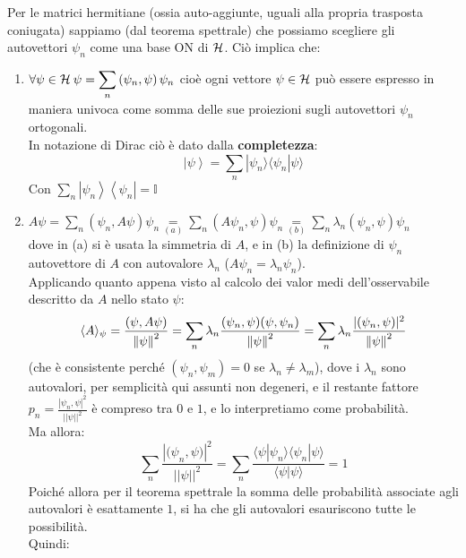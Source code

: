 Per le matrici hermitiane (ossia auto-aggiunte, uguali alla propria trasposta coniugata) sappiamo (dal teorema spettrale) che possiamo scegliere gli autovettori $\psi_n$ come una base ON di $\mathcal{H}$. Ciò implica che:
\begin{enumerate}
    \item $\displaystyle \forall \psi \in \mathcal{H} \> \psi = \sum_{n}{\left(\psi_n, \psi\right)\psi_n}$
    cioè ogni vettore $\psi \in \mathcal{H}$ può essere espresso in maniera univoca come somma delle sue proiezioni sugli autovettori $\psi_n$ ortogonali.\\
    In notazione di Dirac ciò è dato dalla \textbf{completezza}:
    \[
	\left|\psi\right\rangle=\sum_{n}{|\psi_n\rangle \langle\psi_n|\psi\rangle }
	\]
	Con $\sum_{n}{\left|\psi_n\right\rangle\left\langle\psi_n\right|=\mathbb{I}}$
	\item $\displaystyle A\psi = \sum_{n}{\left(\psi_n, A\psi\right)\psi_n \underset{(a)}{=} \sum_{n}{\left(A\psi_n, \psi\right)\psi_n \underset{(b)}{=}\sum_{n}{\lambda_n\left(\psi_n, \psi\right)\psi_n}}}$\\
	dove in (a) si è usata la simmetria di $A$, e in (b) la definizione di $\psi_n$ autovettore di $A$ con autovalore $\lambda_n$ ($A\psi_n = \lambda_n \psi_n$).\\
	Applicando quanto appena visto al calcolo dei valor medi dell'osservabile descritto da $A$ nello stato $\psi$:
	\[
	\langle A \rangle_\psi = \frac{(\psi,A\psi)}{\left\lVert\psi\right\rVert^2} = \sum_n \lambda_n \frac{(\psi_n, \psi)(\psi, \psi_n)}{\left\lVert\psi\right\rVert^2} = \sum_n \lambda_n \frac{|(\psi_n, \psi)|^2}{\left\lVert\psi\right\rVert^2}
	\]
	(che è consistente perché $\left(\psi_n, \psi_m\right)=0$ se $\lambda_n\neq \lambda_m$), dove i $\lambda_n$ sono autovalori, per semplicità qui assunti non degeneri, e il restante fattore $\displaystyle p_n = \frac{\left|\psi_n,\psi\right|^2}{\left|\left|\psi\right|\right|^2}$ è compreso tra $0$ e $1$, e lo interpretiamo come probabilità.\\
	Ma allora:
	\[
	\sum_{n}{\frac{\left|{(\psi}_n, \psi)\right|^2}{\left|\left|\psi\right|\right|^2}=\sum_{n}\frac{\langle\psi|\psi_n\rangle \langle\psi_n|\psi\rangle }{\langle\psi|\psi\rangle }=1 }
	\]
	Poiché allora per il teorema spettrale la somma delle probabilità associate agli autovalori è esattamente $1$, si ha che gli autovalori esauriscono tutte le possibilità.\\
	Quindi:
	\begin{align*}

\end{align*}
\end{enumerate}

